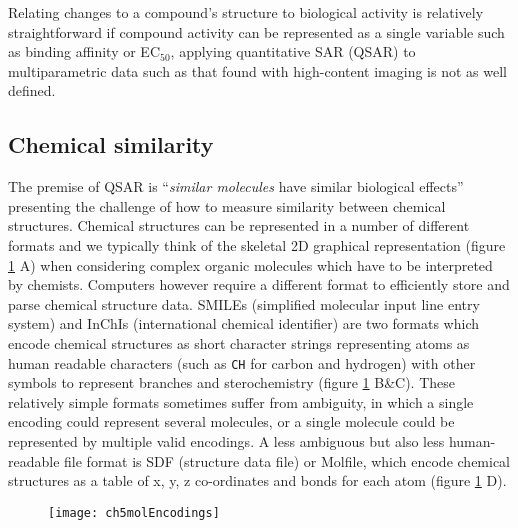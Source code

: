 \documentclass[a4paper,11pt,twoside,openright]{scrbook}
\begin{document}
Relating changes to a compound's structure to biological activity is relatively straightforward if compound activity can be represented as a single variable such as binding affinity or EC$_{50}$, applying quantitative SAR (QSAR) to multiparametric data such as that found with high-content imaging is not as well defined.




\subsection{Chemical similarity}
The premise of QSAR is ``\textsl{similar molecules} have similar biological effects'' presenting the challenge of how to measure similarity between chemical structures.
Chemical structures can be represented in a number of different formats and we typically think of the skeletal 2D graphical representation (figure \ref{figure:mol_encodings} A) when considering complex organic molecules which have to be interpreted by chemists.
Computers however require a different format to efficiently store and parse chemical structure data.
SMILEs (simplified molecular input line entry system) and InChIs (international chemical identifier) are two formats which encode chemical structures as short character strings representing atoms as human readable characters (such as \texttt{CH} for carbon and hydrogen) with other symbols to represent branches and sterochemistry (figure \ref{figure:mol_encodings} B\&C).
These relatively simple formats sometimes suffer from ambiguity, in which a single encoding could represent several molecules, or a single molecule could be
represented by multiple valid encodings.
A less ambiguous but also less human-readable file format is SDF (structure data file) or Molfile, which encode chemical structures as a table of x, y, z co-ordinates and bonds for each atom (figure \ref{figure:mol_encodings} D).

\begin{figure}
     {
    \texttt{[image: ch5molEncodings]}
    \label{figure:mol_encodings}
}
\end{figure}
\end{document}
